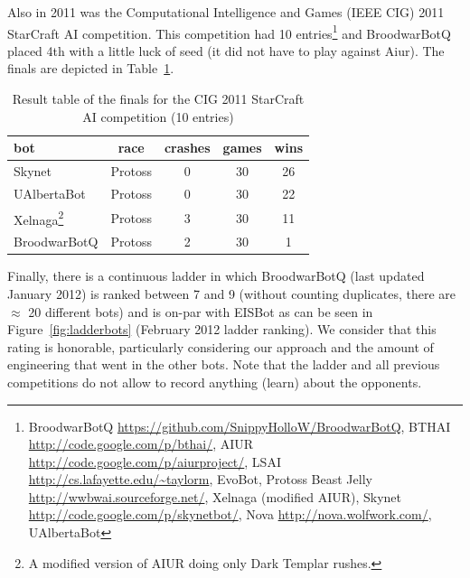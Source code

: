 
Also in 2011 was the Computational Intelligence and Games (IEEE CIG) 2011 StarCraft AI competition. This competition had 10 entries\footnote{BroodwarBotQ \url{https://github.com/SnippyHolloW/BroodwarBotQ}, BTHAI \url{http://code.google.com/p/bthai/}, AIUR \url{http://code.google.com/p/aiurproject/}, LSAI \url{http://cs.lafayette.edu/~taylorm}, 
EvoBot, Protoss Beast Jelly \url{http://wwbwai.sourceforge.net/}, Xelnaga (modified AIUR), Skynet \url{http://code.google.com/p/skynetbot/}, Nova \url{http://nova.wolfwork.com/}, UAlbertaBot} and BroodwarBotQ placed 4th with a little luck of seed (it did not have to play against Aiur). The finals are depicted in Table~\ref{tab:botsCIG}.
\begin{table}[h]
    \begin{center}
    \begin{tabular}{|l|c|c|c|c|}
        \hline
bot & race & crashes & games & wins \\ 
        \hline
Skynet & Protoss & 0 & 30 & 26 \\ 
UAlbertaBot & Protoss & 0 & 30 &  22\\
Xelnaga\footnote{A modified version of AIUR doing only Dark Templar rushes.} & Protoss & 3 & 30 & 11 \\
BroodwarBotQ & Protoss & 2 & 30 & 1\\
        \hline
    \end{tabular}
    \end{center}
    \caption{Result table of the finals for the CIG 2011 StarCraft AI competition (10 entries)}
    \label{tab:botsCIG}
\end{table}

Finally, there is a continuous ladder in which BroodwarBotQ (last updated January 2012) is ranked between 7 and 9 (without counting duplicates, there are $\approx$ 20 different bots) and is on-par with EISBot \citep{WeberCIG10,Weber2010cr} as can be seen in Figure~\ref{fig:ladderbots} (February 2012 ladder ranking). We consider that this rating is honorable, particularly considering our approach and the amount of engineering that went in the other bots. Note that the ladder and all previous competitions do not allow to record anything (learn) about the opponents.

